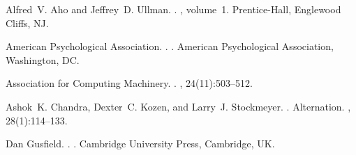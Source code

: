 \documentclass[11pt]{article}
\begin{document}
\begin{thebibliography}{}

Alfred~V. Aho and Jeffrey~D. Ullman.
.
, volume~1.
\newblock Prentice-{Hall}, Englewood Cliffs, NJ.

{American Psychological Association}.
.
.
\newblock American Psychological Association, Washington, DC.

{Association for Computing Machinery}.
.
, 24(11):503--512.

Ashok~K. Chandra, Dexter~C. Kozen, and Larry~J. Stockmeyer.
.
\newblock Alternation.
,
  28(1):114--133.

Dan Gusfield.
.
.
\newblock Cambridge University Press, Cambridge, UK.

\end{thebibliography}
\end{document}
